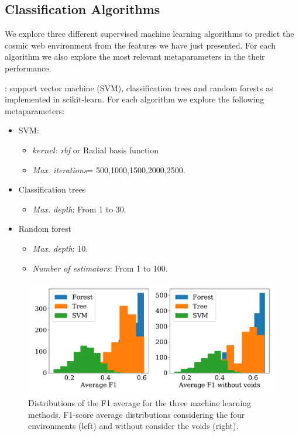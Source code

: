 \documentclass[usenatbib]{mnras}
\begin{document}
\subsection{Classification Algorithms}

We explore three different supervised machine learning algorithms to
predict the cosmic web environment from the features we have just
presented.
For each algorithm we also explore the most relevant metaparameters in
the their performance.

: support vector machine (SVM),
classification trees and random forests as implemented in scikit-learn. 
 For each algorithm we explore the following metaparameters:
\begin{itemize}
    \item SVM: 
        \begin{itemize}
            \item $kernel$: \textit{rbf} or Radial basis function
            \item \textit{Max. iterations}= 500,1000,1500,2000,2500.
        \end{itemize}
    \item Classification trees
        \begin{itemize}
            \item \textit{Max. depth}: From 1 to 30.
        \end{itemize}
    \item Random forest
        \begin{itemize}
            \item \textit{Max. depth}: 10.
            \item \textit{Number of estimators}: From 1 to 100.
        \end{itemize}
\end{itemize}

\begin{figure}
    \includegraphics[scale=0.46]{Figs/p_hist_f1.pdf}
    \caption{Distributions of the F1 average for the three machine learning methods. F1-score average distributions considering the four environments (left) and without consider the voids (right).}
    \label{fig:methods}
\end{figure}
\end{document}
